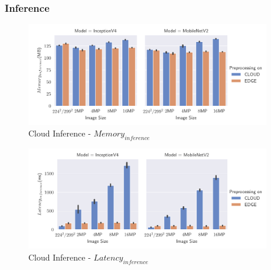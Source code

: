 \subsubsection{Inference}
\begin{figure}[H]
\centering
\includegraphics[width=0.95\textwidth]{./Bilder/single_plots/cloud_inference_plots/Cloud_Inference_Memory.pdf}
\caption{Cloud Inference -  $Memory_{inference}$}
\label{fig:cloudInferenceInferenceMemory}
\end{figure}
\begin{figure}[H]
\centering
\includegraphics[width=0.95\textwidth]{./Bilder/single_plots/cloud_inference_plots/Cloud_Inference_Latency.pdf}
\caption{Cloud Inference -  $Latency_{inference}$}
\label{fig:cloudInferenceInferenceLatency}
\end{figure}



